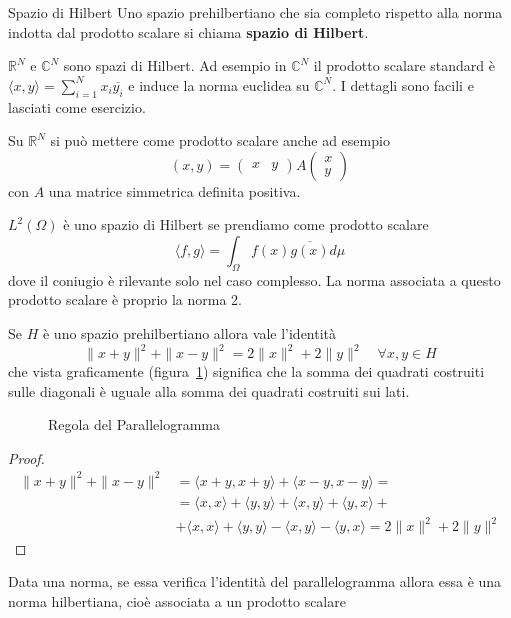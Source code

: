 \begin{definition}{Spazio di Hilbert}
    Uno spazio prehilbertiano che sia completo rispetto alla norma indotta dal
    prodotto scalare si chiama \textbf{spazio di Hilbert}.
\end{definition}
\begin{example}
    \(\mathbb{R}^{N}\) e \(\mathbb{C}^{N}\) sono spazi di Hilbert. Ad esempio in
    \(\mathbb{C}^{N}\) il prodotto scalare standard è \(\langle x, y \rangle =
    \sum_{i=1}^{N} x_{i} \overline{y_{i}}\) e induce la norma euclidea su
    \(\mathbb{C}^{N}\). I dettagli sono facili e lasciati come esercizio.

    Su \(\mathbb{R}^{N}\) si può mettere come prodotto scalare anche ad esempio
    \[
        {(x, y)} = \begin{pmatrix}
            x & y
        \end{pmatrix} A \begin{pmatrix}
            x \\ y
        \end{pmatrix}
    \]
    con \(A\) una matrice simmetrica definita positiva.
\end{example}
\begin{example}
    \(L^{2}{(\Omega)}\) è uno spazio di Hilbert se prendiamo come prodotto
    scalare 
    \[
        \langle f, g \rangle = \int_{\Omega} f(x) \overline{g(x)} d\mu
    \]
    dove il coniugio è rilevante solo nel caso complesso. La norma associata a
    questo prodotto scalare è proprio la norma 2.
\end{example}
\begin{proposition}\label{prop:parallelogramma}
    Se \(H\) è uno spazio prehilbertiano allora vale l'identità
    \[
        \|x + y\|^2 + \|x - y\|^2 = 2\|x\|^2 + 2\|y\|^2 \quad \forall x, y \in H
    \]
    che vista graficamente (figura~\ref{fig:parallelogramma}) significa che la somma dei quadrati costruiti
    sulle diagonali è uguale alla somma dei quadrati costruiti sui lati.
\end{proposition}
\begin{figure}[ht]
    \centering
    \caption{Regola del Parallelogramma}\label{fig:parallelogramma}
\end{figure}
\begin{proof}
    \begin{align*}
        \|x+y\|^2 + \|x-y\|^2 &= \langle x+y, x+y \rangle + \langle x-y, x-y
        \rangle = \\ &= \langle x, x \rangle + \langle y, y \rangle + \langle x, y
        \rangle + \langle y, x \rangle + \\ &+ \langle x, x \rangle + \langle y, y
        \rangle - \langle x, y \rangle - \langle y, x \rangle = 2\|x\|^2 +
        2\|y\|^2
    \end{align*}
\end{proof}
    Data una norma, se essa verifica l'identità del parallelogramma allora
    essa è una norma hilbertiana, cioè associata a un prodotto scalare

